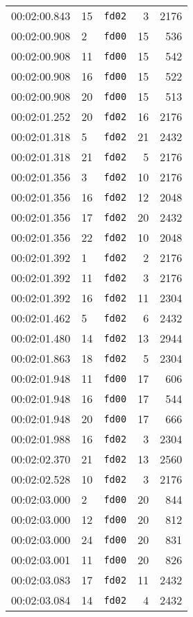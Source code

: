 \documentclass{article}
\begin{document}
\begin{longtable}{lllrr}
00:02:00.843 & 15 & \texttt{fd02} & 3 & 2176 \\
00:02:00.908 & 2 & \texttt{fd00} & 15 & 536 \\
00:02:00.908 & 11 & \texttt{fd00} & 15 & 542 \\
00:02:00.908 & 16 & \texttt{fd00} & 15 & 522 \\
00:02:00.908 & 20 & \texttt{fd00} & 15 & 513 \\
00:02:01.252 & 20 & \texttt{fd02} & 16 & 2176 \\
00:02:01.318 & 5 & \texttt{fd02} & 21 & 2432 \\
00:02:01.318 & 21 & \texttt{fd02} & 5 & 2176 \\
00:02:01.356 & 3 & \texttt{fd02} & 10 & 2176 \\
00:02:01.356 & 16 & \texttt{fd02} & 12 & 2048 \\
00:02:01.356 & 17 & \texttt{fd02} & 20 & 2432 \\
00:02:01.356 & 22 & \texttt{fd02} & 10 & 2048 \\
00:02:01.392 & 1 & \texttt{fd02} & 2 & 2176 \\
00:02:01.392 & 11 & \texttt{fd02} & 3 & 2176 \\
00:02:01.392 & 16 & \texttt{fd02} & 11 & 2304 \\
00:02:01.462 & 5 & \texttt{fd02} & 6 & 2432 \\
00:02:01.480 & 14 & \texttt{fd02} & 13 & 2944 \\
00:02:01.863 & 18 & \texttt{fd02} & 5 & 2304 \\
00:02:01.948 & 11 & \texttt{fd00} & 17 & 606 \\
00:02:01.948 & 16 & \texttt{fd00} & 17 & 544 \\
00:02:01.948 & 20 & \texttt{fd00} & 17 & 666 \\
00:02:01.988 & 16 & \texttt{fd02} & 3 & 2304 \\
00:02:02.370 & 21 & \texttt{fd02} & 13 & 2560 \\
00:02:02.528 & 10 & \texttt{fd02} & 3 & 2176 \\
00:02:03.000 & 2 & \texttt{fd00} & 20 & 844 \\
00:02:03.000 & 12 & \texttt{fd00} & 20 & 812 \\
00:02:03.000 & 24 & \texttt{fd00} & 20 & 831 \\
00:02:03.001 & 11 & \texttt{fd00} & 20 & 826 \\
00:02:03.083 & 17 & \texttt{fd02} & 11 & 2432 \\
00:02:03.084 & 14 & \texttt{fd02} & 4 & 2432 \\

\end{longtable}
\end{document}
